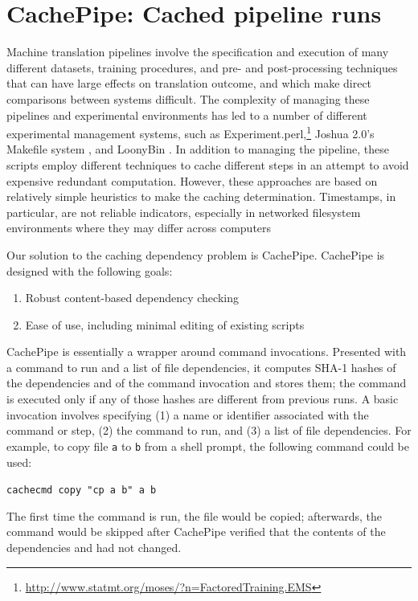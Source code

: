 \documentclass[11pt]{article}
\begin{document}
\section{CachePipe: Cached pipeline runs}

Machine translation pipelines involve the specification and execution
of many different datasets, training procedures, and pre- and
post-processing techniques that can have large effects on translation
outcome, and which make direct comparisons between systems difficult.
The complexity of managing these pipelines and experimental
environments has led to a number of different experimental management
systems, such as
Experiment.perl,\footnote{\url{http://www.statmt.org/moses/?n=FactoredTraining.EMS}}
Joshua 2.0's Makefile system \cite{li2010joshua}, and LoonyBin
\cite{clark2010loonybin}.  In addition to managing the pipeline, these
scripts employ different techniques to cache different steps in an
attempt to avoid expensive redundant computation.  However, these
approaches are based on relatively simple heuristics to make the
caching determination.  Timestamps, in particular, are not reliable
indicators, especially in networked filesystem environments where
they may differ across computers

Our solution to the caching dependency problem is CachePipe.
CachePipe is designed with the following goals:

\begin{enumerate}
\item Robust content-based dependency checking
\item Ease of use, including minimal editing of existing scripts
\end{enumerate}

\noindent CachePipe is essentially a wrapper around command
invocations.  Presented with a command to run
and a list of file dependencies, it computes SHA-1 hashes of the
dependencies and of the command invocation and stores them; the
command is executed only if any of those hashes are different from
previous runs.  A
basic invocation involves specifying (1) a name or identifier
associated with the command or step, (2) the command to run, and (3) a
list of file dependencies.  For example, to copy file \verb|a| to
\verb|b| from a shell prompt, the following command could be used:

\verb|cachecmd copy "cp a b" a b|

\noindent The first time the command is run, the file would be copied;
afterwards, the command would be skipped after CachePipe verified that
the contents of the dependencies and had not changed.
\end{document}
